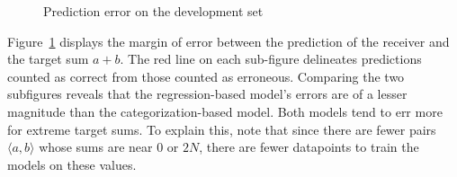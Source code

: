 \documentclass[twocolumn]{article}
\begin{document}
\begin{figure}[ht]
    \centering
    
    \caption{Prediction error on the development set}
    \label{fig:error}
\end{figure}

Figure~\ref{fig:error} displays the margin of error between the prediction of the receiver and the target sum $a+b$.
The red line on each sub-figure delineates predictions counted as correct from those counted as erroneous.
Comparing the two subfigures reveals that the regression-based model's errors are of a lesser magnitude than the categorization-based model.
Both models tend to err more for extreme target sums.
To explain this, note that since there are fewer pairs $\langle a,b \rangle$ whose sums are near 0 or $2N$, there are fewer datapoints to train the models on these values.
\end{document}
